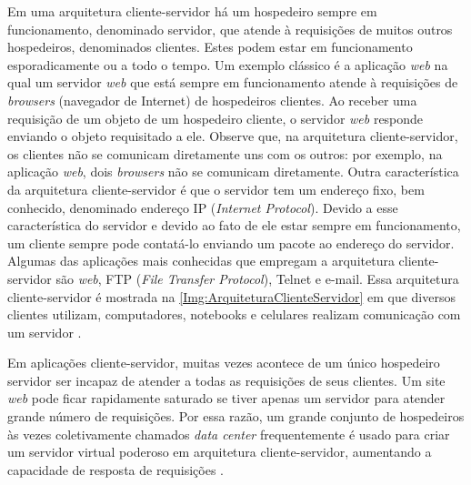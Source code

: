 Em uma arquitetura cliente-servidor há um hospedeiro sempre em funcionamento, denominado servidor, que atende à requisições de muitos outros hospedeiros, denominados clientes. Estes podem estar em funcionamento esporadicamente ou a todo o tempo. Um exemplo clássico é a aplicação \textit{web} na qual um servidor \textit{web} que está sempre em funcionamento atende à requisições de \textit{browsers} (navegador de Internet) de hospedeiros clientes. Ao receber uma requisição de um objeto de um hospedeiro cliente, o servidor \textit{web} responde enviando o objeto requisitado a ele. Observe que, na arquitetura cliente-servidor, os clientes não se comunicam diretamente uns com os outros: por exemplo, na aplicação \textit{web}, dois \textit{browsers} não se comunicam diretamente. Outra característica da arquitetura cliente-servidor é que o servidor tem um endereço fixo, bem conhecido, denominado endereço IP (\textit{Internet Protocol}). Devido a esse característica do servidor e devido ao fato de ele estar sempre em funcionamento, um cliente sempre pode contatá-lo enviando um pacote ao endereço do servidor. Algumas das aplicações mais conhecidas que empregam a arquitetura cliente-servidor são \textit{web}, FTP (\textit{File Transfer Protocol}), Telnet e e-mail. Essa arquitetura cliente-servidor é mostrada na \autoref{Img:ArquiteturaClienteServidor} em que diversos clientes utilizam, computadores, notebooks e celulares realizam comunicação com um servidor \cite{Kurose:2010}.

Em aplicações cliente-servidor, muitas vezes acontece de um único hospedeiro servidor ser incapaz de atender a todas as requisições de seus clientes. Um site \textit{web} pode ficar rapidamente saturado se tiver apenas um servidor para atender grande número de requisições. Por essa razão, um grande conjunto de hospedeiros às vezes coletivamente chamados \textit{data center} frequentemente é usado para criar um servidor virtual poderoso em arquitetura cliente-servidor, aumentando a capacidade de resposta de requisições \cite{Kurose:2010}.


